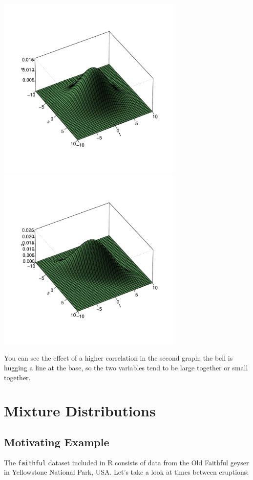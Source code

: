 \includegraphics[width=3.6in]{Images/Rho2.pdf} 
\includegraphics[width=3.6in]{Images/Rho8.pdf} 

You can see the effect of a higher correlation in the second graph; the
bell is hugging a line at the base, so the two variables tend to be
large together or small together.

\section{Mixture Distributions}

\subsection{Motivating Example}

The \lstinline{faithful} dataset included in R consists of data from the
Old Faithful geyser in Yellowstone National Park, USA.  Let's take a
look at times between eruptions:

